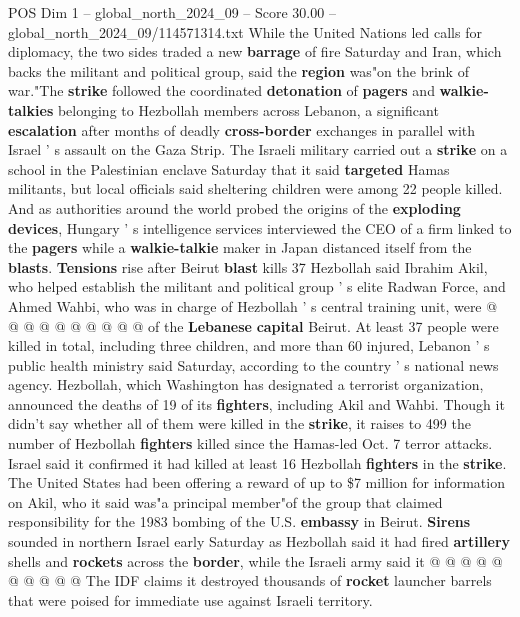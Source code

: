 \begin{textsample}{POS Dim 1 – global\_north\_2024\_09 – Score 30.00 – global\_north\_2024\_09/114571314.txt}  \label{ex:f1_pos_093}
While the United Nations led calls for diplomacy, the two sides traded a new \textbf{barrage} of fire Saturday and Iran, which backs the militant and political group, said the \textbf{region} was"on the brink of war."The \textbf{strike} followed the coordinated \textbf{detonation} of \textbf{pagers} and \textbf{walkie-talkies} belonging to Hezbollah members across Lebanon, a significant \textbf{escalation} after months of deadly \textbf{cross-border} exchanges in parallel with Israel ' s assault on the Gaza Strip.
The Israeli military carried out a \textbf{strike} on a school in the Palestinian enclave Saturday that it said \textbf{targeted} Hamas militants, but local officials said sheltering children were among 22 people killed.
And as authorities around the world probed the origins of the \textbf{exploding} \textbf{devices}, Hungary ' s intelligence services interviewed the CEO of a firm linked to the \textbf{pagers} while a \textbf{walkie-talkie} maker in Japan distanced itself from the \textbf{blasts}. \textbf{Tensions} rise after Beirut \textbf{blast} kills 37 Hezbollah said Ibrahim Akil, who helped establish the militant and political group ' s elite Radwan Force, and Ahmed Wahbi, who was in charge of Hezbollah ' s central training unit, were @ @ @ @ @ @ @ @ @ @ of the \textbf{Lebanese} \textbf{capital} Beirut.
At least 37 people were killed in total, including three children, and more than 60 injured, Lebanon ' s public health ministry said Saturday, according to the country ' s national news agency.
Hezbollah, which Washington has designated a terrorist organization, announced the deaths of 19 of its \textbf{fighters}, including Akil and Wahbi.
Though it didn't say whether all of them were killed in the \textbf{strike}, it raises to 499 the number of Hezbollah \textbf{fighters} killed since the Hamas-led Oct. 7 terror attacks.
Israel said it confirmed it had killed at least 16 Hezbollah \textbf{fighters} in the \textbf{strike}.
The United States had been offering a reward of up to \$7 million for information on Akil, who it said was"a principal member"of the group that claimed responsibility for the 1983 bombing of the U.S. \textbf{embassy} in Beirut. \textbf{Sirens} sounded in northern Israel early Saturday as Hezbollah said it had fired \textbf{artillery} shells and \textbf{rockets} across the \textbf{border}, while the Israeli army said it @ @ @ @ @ @ @ @ @ @ The IDF claims it destroyed thousands of \textbf{rocket} launcher barrels that were poised for immediate use against Israeli territory.

\end{textsample}
